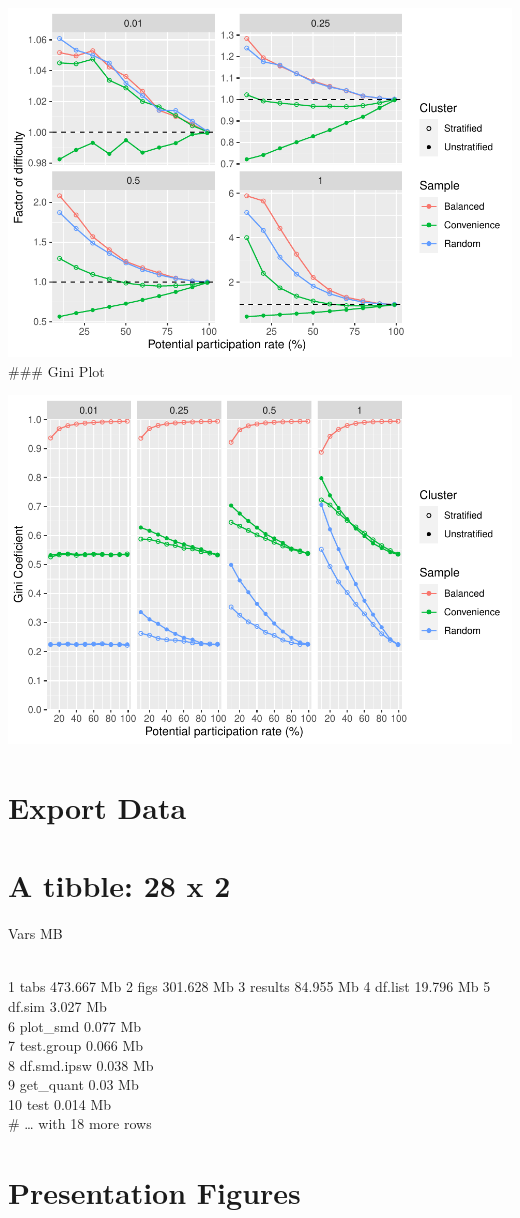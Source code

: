 \documentclass[
  man,floatsintext]{apa6}
\begin{document}
\includegraphics{5---Analysis_files/figure-latex/unnamed-chunk-52-1.pdf}
\#\#\# Gini Plot

\includegraphics{5---Analysis_files/figure-latex/unnamed-chunk-54-1.pdf}

\hypertarget{export-data}{%
\section{Export Data}\label{export-data}}

\hypertarget{a-tibble-28-x-2}{%
\section{A tibble: 28 x 2}\label{a-tibble-28-x-2}}

Vars MB\\
\strut \\
1 tabs 473.667 Mb
2 figs 301.628 Mb
3 results 84.955 Mb
4 df.list 19.796 Mb
5 df.sim 3.027 Mb\\
6 plot\_smd 0.077 Mb\\
7 test.group 0.066 Mb\\
8 df.smd.ipsw 0.038 Mb\\
9 get\_quant 0.03 Mb\\
10 test 0.014 Mb\\
\# \ldots{} with 18 more rows

\hypertarget{presentation-figures}{%
\section{Presentation Figures}\label{presentation-figures}}
\end{document}
